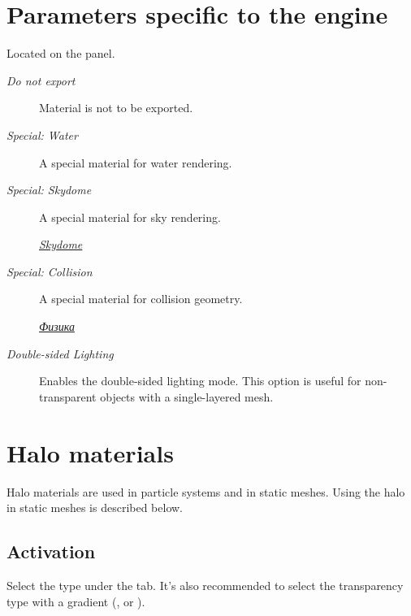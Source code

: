 \documentclass[a4paper,12pt,oneside]{sphinxmanual}
\begin{document}

\section{Parameters specific to the engine}
\label{materials:id13}\label{materials:index-9}
Located on the  panel.
\begin{description}
\item[{\emph{Do not export}}] \leavevmode
Material is not to be exported.

\item[{\emph{Special: Water}}] \leavevmode
A special material for water rendering.

\item[{\emph{Special: Skydome}}] \leavevmode
A special material for sky rendering.




{\hyperref[textures:skydome-texture]{\emph{Skydome}}}



\item[{\emph{Special: Collision}}] \leavevmode
A special material for collision geometry.




{\hyperref[physics:physics]{\emph{Физика}}}



\item[{\emph{Double-sided Lighting}}] \leavevmode
Enables the double-sided lighting mode. This option is useful for non-transparent objects with a single-layered mesh.

\end{description}


\section{Halo materials}
\label{materials:material-halo}\label{materials:index-10}\label{materials:halo}
Halo materials are used in particle systems and in static meshes. Using the halo in static meshes is described below.


\subsection{Activation}
\label{materials:id14}
Select the  type under the  tab. It's also recommended to select the transparency type with a gradient (,  or ).
\end{document}
